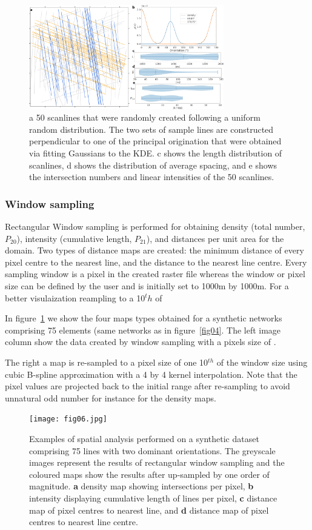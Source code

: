 \documentclass[a4paper,fleqn]{cas-sc}
\begin{document}
\begin{figure}[h]
\centering
	\includegraphics[width=8.5cm]{fig05.jpg}
	\caption{a 50 scanlines that were randomly created following a uniform random distribution. The two sets of sample lines are constructed perpendicular to one of the principal origination that were obtained via fitting Gaussians to the KDE. c shows the length distribution of scanlines, d shows the distribution of average spacing, and e shows the intersection numbers and linear intensities of the 50 scanlines. }
\label{fig05}
\end{figure}

\subsubsection{Window sampling}
Rectangular Window sampling is performed for obtaining density (total number, $P_{20}$), intensity (cumulative length, $P_{21}$), and distances per unit area for the domain. Two types of distance maps are created: the minimum distance of every pixel centre to the nearest line, and the distance to the nearest line centre. 
Every sampling window is a pixel in the created raster file whereas the window or pixel size can be defined by the user and is initially set to 1000m by 1000m. For a better visulaization reampling to a 10$^th$ of


In figure~\ref{fig05} we show the four maps types obtained for a synthetic networks comprising 75 elements (same networks as in figure~\ref{fig04}. The left image column show the data created by window sampling with a pixels size of . 


The right a map is re-sampled to a pixel size of one 10$^{th}$ of the window size using cubic B-spline approximation with a 4 by 4 kernel interpolation. Note that the pixel values are projected back to the initial range after re-sampling to avoid unnatural odd number for instance for the density maps.

\begin{figure}[h]
\centering
	\texttt{[image: fig06.jpg]}
	\caption{Examples of spatial analysis performed on a synthetic dataset comprising 75 lines with two dominant orientations. The greyscale images represent the results of rectangular window sampling and the coloured maps show the results after up-sampled by one order of magnitude. \textbf{a} density map showing intersections per pixel, \textbf{b} intensity displaying cumulative length of lines per pixel, \textbf{c} distance map of pixel centres to nearest line, and \textbf{d} distance map of pixel centres to nearest line centre.}
\label{fig06}
\end{figure}
\end{document}
